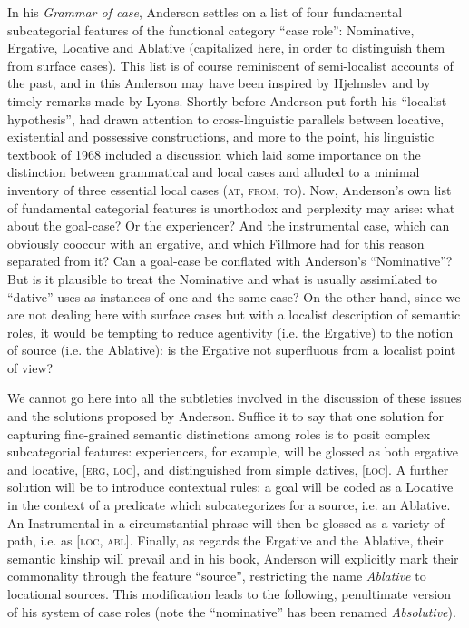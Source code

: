 \documentclass[output=paper]{langscibook}
\begin{document}
In his \textit{Grammar of case}, Anderson settles on a list of four fundamental subcategorial features of the functional category ``case role'': Nominative, Ergative, Locative and Ablative (capitalized here, in order to distinguish them from surface cases). This list is of course reminiscent of semi-localist accounts of the past, and in this Anderson may have been inspired by Hjelmslev and by timely remarks made by Lyons. Shortly before Anderson put forth his “localist hypothesis”, \citet{lyons_note_1967} had drawn attention to cross-linguistic parallels between locative, existential and possessive constructions, and more to the point, his linguistic textbook of 1968 included a discussion which laid some importance on the distinction between grammatical and local cases and alluded to a minimal inventory of three essential local cases (\textsc{at}, \textsc{from}, \textsc{to}). Now, Anderson’s own list of fundamental categorial features is unorthodox and perplexity may arise: what about the goal-case? Or the experiencer? And the instrumental case, which can obviously cooccur with an ergative, and which Fillmore had for this reason separated from it? Can a goal-case be conflated with Anderson’s ``Nominative''? But is it plausible to treat the Nominative and what is usually assimilated to ``dative'' uses as instances of one and the same case? On the other hand, since we are not dealing here with surface cases but with a localist description of semantic roles, it would be tempting to reduce agentivity (i.e. the Ergative) to the notion of source (i.e. the Ablative): is the Ergative not superfluous from a localist point of view?

We cannot go here into all the subtleties involved in the discussion of these issues and the solutions proposed by Anderson. Suffice it to say that one solution for capturing fine-grained semantic distinctions among roles is to posit complex subcategorial features: experiencers, for example, will be glossed as both ergative and locative, [\textsc{erg}, \textsc{loc}], and distinguished from simple datives, [\textsc{loc}]. A further solution will be to introduce contextual rules: a goal will be coded as a Locative in the context of a predicate which subcategorizes for a source, i.e. an Ablative. An Instrumental in a circumstantial phrase will then be glossed as a variety of path, i.e. as [\textsc{loc}, \textsc{abl}]. Finally, as regards the Ergative and the Ablative, their semantic kinship will prevail and in his \citeyear{anderson_case_1977} book, Anderson will explicitly mark their commonality through the feature ``source'', restricting the name \textit{Ablative} to locational sources. This modification leads to the following, penultimate version of his system of case roles (note the ``nominative'' has been renamed \textit{Absolutive}).
\end{document}
